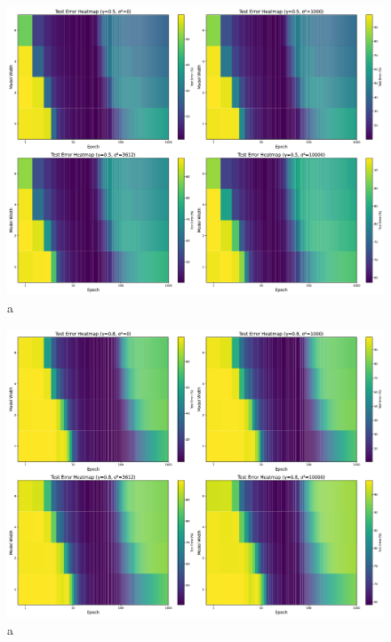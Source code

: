 \begin{figure}[H]
    \centering
    \includegraphics[width=\linewidth]{fig/heatmap_ln/ln0.5.pdf}
    \caption{a}
    \label{fig:modelwidth_heatmap_0.5}
\end{figure}

\begin{figure}[H]
    \centering
    \includegraphics[width=\linewidth]{fig/heatmap_ln/ln0.8.pdf}
    \caption{a}
    \label{fig:modelwidth_heatmap_0.8}
\end{figure}
